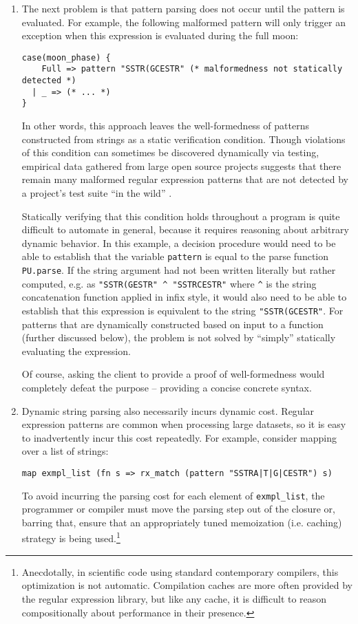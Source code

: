 \begin{enumerate}
\item The next problem is that pattern parsing does not occur until the pattern is evaluated. For example, the following malformed pattern will only trigger an exception when this expression is evaluated during the full moon: %

\begin{lstlisting}[numbers=none]
case(moon_phase) {
    Full => pattern "SSTR(GCESTR" (* malformedness not statically detected *)
  | _ => (* ... *)
}
\end{lstlisting}
In other words, this approach leaves the well-formedness of patterns constructed from strings as a static verification condition. 
Though violations of this condition can sometimes be discovered dynamically via testing, empirical data gathered from large open source projects suggests that there remain many malformed regular expression patterns that are not detected by a project's test suite ``in the wild'' \cite{spishak2012type}. 

Statically verifying that this condition holds throughout a program is quite difficult to automate in general, because it requires reasoning about arbitrary dynamic behavior. In this example, a decision procedure would need to be able to establish that the variable \lstinline{pattern} is equal to the parse function \lstinline{PU.parse}. If the string argument had not been written literally but rather computed, e.g. as \lstinline{"SSTR(GESTR" ^ "SSTRCESTR"} where \lstinline{^} is the string concatenation function applied in infix style, it would also need to be able to establish that this expression is equivalent to the string \lstinline{"SSTR(GCESTR"}. For patterns that are dynamically constructed based on input to a function (further discussed below), the problem is not solved by ``simply'' statically evaluating the expression. 

Of course, asking the client to provide a proof of well-formedness would completely defeat the purpose -- providing a concise concrete syntax.

\item Dynamic string parsing also necessarily incurs dynamic cost. Regular expression patterns are common when processing large datasets, so it is easy to inadvertently incur this cost repeatedly. For example, consider mapping over a list of strings:
\begin{lstlisting}[numbers=none]
map exmpl_list (fn s => rx_match (pattern "SSTRA|T|G|CESTR") s)
\end{lstlisting}
To avoid incurring the parsing cost for each element of \lstinline{exmpl_list}, the programmer or compiler must move the parsing step out of the closure or, barring that, ensure that an appropriately tuned memoization (i.e. caching) strategy is being used.\footnote{Anecdotally, in scientific code using standard contemporary compilers, this optimization is not automatic. Compilation caches are more often provided by the regular expression library, but like any cache, it is difficult to reason compositionally about performance in their presence.} %


\end{enumerate}
